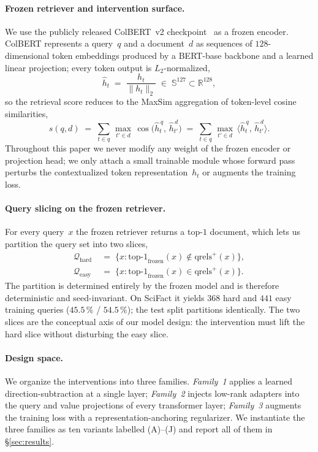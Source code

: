 \paragraph{Frozen retriever and intervention surface.}
We use the publicly released ColBERT~v2 checkpoint~\cite{santhanam2022colbertv2} as a frozen encoder. ColBERT represents a query~$q$ and a document~$d$ as sequences of $128$-dimensional token embeddings produced by a BERT-base backbone and a learned linear projection; every token output is $L_2$-normalized,
\begin{equation}
\hat h_t \;=\; \frac{h_t}{\|h_t\|_2} \;\in\; \mathbb{S}^{127} \subset \mathbb{R}^{128},
\label{eq:hat-h}
\end{equation}
so the retrieval score reduces to the MaxSim aggregation of token-level cosine similarities,
\begin{equation}
s(q, d) \;=\; \sum_{t \in q}\,\max_{t' \in d}\,\cos\bigl(\hat h_t^{\,q},\, \hat h_{t'}^{\,d}\bigr) \;=\; \sum_{t \in q}\,\max_{t' \in d}\,\bigl\langle \hat h_t^{\,q},\, \hat h_{t'}^{\,d}\bigr\rangle.
\label{eq:maxsim}
\end{equation}
Throughout this paper we never modify any weight of the frozen encoder or projection head; we only attach a small trainable module whose forward pass perturbs the contextualized token representation~$h_t$ or augments the training loss.

\paragraph{Query slicing on the frozen retriever.}
For every query~$x$ the frozen retriever returns a top-$1$ document, which lets us partition the query set into two slices,
\begin{align}
\mathcal{Q}_{\text{hard}} &\;=\;\{x : \mathrm{top\text{-}1}_{\text{frozen}}(x) \notin \mathrm{qrels}^{+}(x)\}, \\
\mathcal{Q}_{\text{easy}} &\;=\;\{x : \mathrm{top\text{-}1}_{\text{frozen}}(x) \in \mathrm{qrels}^{+}(x)\}.
\end{align}
The partition is determined entirely by the frozen model and is therefore deterministic and seed-invariant. On SciFact it yields $368$ hard and $441$ easy training queries ($45.5\,\%$ / $54.5\,\%$); the test split partitions identically. The two slices are the conceptual axis of our model design: the intervention must lift the hard slice without disturbing the easy slice.

\paragraph{Design space.}
We organize the interventions into three families. \emph{Family~1} applies a learned direction-subtraction at a single layer; \emph{Family~2} injects low-rank adapters into the query and value projections of every transformer layer; \emph{Family~3} augments the training loss with a representation-anchoring regularizer. We instantiate the three families as ten variants labelled (A)--(J) and report all of them in \S\ref{sec:results}.

